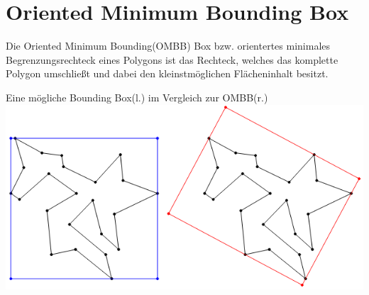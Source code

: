 \section{Oriented Minimum Bounding Box}
Die Oriented Minimum Bounding(OMBB) Box bzw. orientertes minimales Begrenzungsrechteck eines Polygons ist das Rechteck, welches das komplette Polygon umschließt und dabei den kleinstmöglichen Flächeninhalt besitzt.
\begin{Bild}{Eine mögliche Bounding Box(l.) im Vergleich zur OMBB(r.)}
	\includegraphics[width=\textwidth]{Bilder/aabb_vs_ombb}
\end{Bild}
